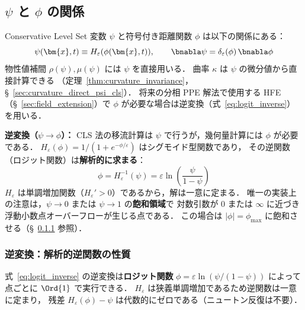 %
%
\subsection{\texorpdfstring{$\psi$}{ψ} と \texorpdfstring{$\phi$}{φ} の関係}
\label{sec:levelset_mapping}

\begin{tcolorbox}[defbox, title={$\psi$--$\phi$ 対応付けと解析的逆変換（ロジット関数）}]
Conservative Level Set 変数 $\psi$ と符号付き距離関数 $\phi$ は以下の関係にある：
\begin{equation}
  \psi(\bm{x},t) \equiv H_\varepsilon(\phi(\bm{x},t)), \qquad \bnabla\psi = \delta_\varepsilon(\phi)\,\bnabla\phi
\end{equation}
物性値補間 $\rho(\psi), \mu(\psi)$ には $\psi$ を直接用いる．
曲率 $\kappa$ は $\psi$ の微分値から直接計算できる
（定理~\ref{thm:curvature_invariance}，§~\ref{sec:curvature_direct_psi_cls}）．
将来の分相 PPE 解法で使用する HFE（§~\ref{sec:field_extension}）で
$\phi$ が必要な場合は逆変換（式~\eqref{eq:logit_inverse}）を用いる．

\medskip
\textbf{逆変換（$\psi \to \phi$）：}
CLS 法の移流計算は $\psi$ で行うが，幾何量計算には $\phi$ が必要である．
$H_\varepsilon(\phi) = 1/(1+e^{-\phi/\varepsilon})$ はシグモイド型関数であり，
その逆関数（ロジット関数）は\textbf{解析的に求まる}：
\begin{equation}
  \phi = H_\varepsilon^{-1}(\psi) = \varepsilon\ln\!\left(\frac{\psi}{1-\psi}\right)
  \label{eq:logit_inverse}
\end{equation}
$H_\varepsilon$ は単調増加関数（$H_\varepsilon' > 0$）であるから，解は一意に定まる．
唯一の実装上の注意は，$\psi \to 0$ または $\psi \to 1$ の\textbf{飽和領域}で
対数引数が $0$ または $\infty$ に近づき浮動小数点オーバーフローが生じる点である．
この場合は $|\phi| = \phi_{\max}$ に飽和させる（§~\ref{sec:newton_inversion} 参照）．
\end{tcolorbox}

\subsubsection{逆変換：解析的逆関数の性質}
\label{sec:newton_inversion}

式~\eqref{eq:logit_inverse} の逆変換は\textbf{ロジット関数}
$\phi = \varepsilon\ln(\psi/(1-\psi))$
によって点ごとに $\Ord{1}$ で実行できる．
$H_\varepsilon$ は狭義単調増加であるため逆関数は一意に定まり，
残差 $H_\varepsilon(\phi) - \psi$ は代数的にゼロである（ニュートン反復は不要）．

